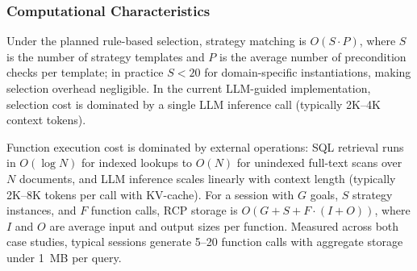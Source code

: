 \documentclass[largeformat]{interact}
\begin{document}
\subsubsection{Computational Characteristics}
\label{subsubsec:computational_characteristics}
Under the planned rule-based selection, strategy matching is $O(S \cdot P)$, where $S$ is the number of strategy templates and $P$ is the average number of precondition checks per template; in practice $S < 20$ for domain-specific instantiations, making selection overhead negligible. In the current LLM-guided implementation, selection cost is dominated by a single LLM inference call (typically 2K--4K context tokens).
 
Function execution cost is dominated by external operations: SQL retrieval runs in $O(\log N)$ for indexed lookups to $O(N)$ for unindexed full-text scans over $N$ documents, and LLM inference scales linearly with context length (typically 2K--8K tokens per call with KV-cache). For a session with $G$ goals, $S$ strategy instances, and $F$ function calls, RCP storage is $O(G + S + F \cdot (I + O))$, where $I$ and $O$ are average input and output sizes per function. Measured across both case studies, typical sessions generate 5--20 function calls with aggregate storage under 1~MB per query.




\end{document}
